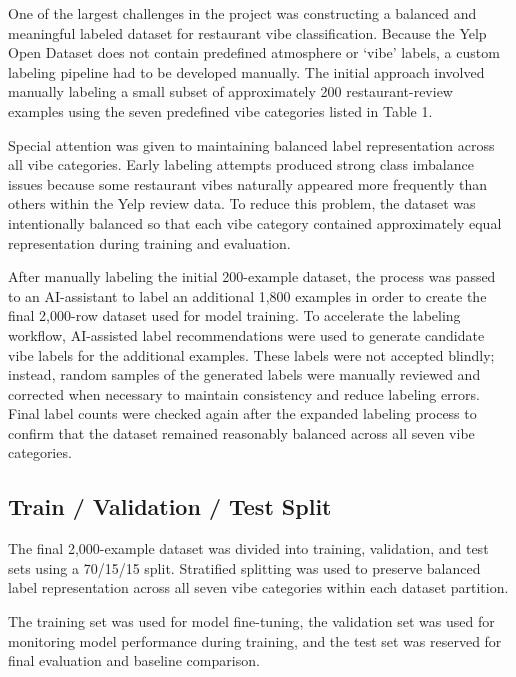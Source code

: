 \documentclass[11pt]{article}
\begin{document}
One of the largest challenges in the project was constructing a balanced and meaningful labeled dataset for restaurant vibe classification. Because the 
Yelp Open Dataset does not contain predefined atmosphere or `vibe' labels, a custom labeling pipeline had to be developed manually. The initial approach 
involved manually labeling a small subset of approximately 200 restaurant-review examples using the seven predefined vibe categories listed in Table 1. 

\medbreak \noindent Special attention was given to maintaining balanced label representation across all vibe categories. Early labeling attempts produced 
strong class imbalance issues because some restaurant vibes naturally appeared more frequently than others within the Yelp review data. To reduce this 
problem, the dataset was intentionally balanced so that each vibe category contained approximately equal representation during training and evaluation.

\medbreak \noindent After manually labeling the initial 200-example dataset, the process was passed to an AI-assistant to label an additional 1,800 examples 
in order to create the final 2,000-row dataset used for model training. To accelerate the labeling workflow, AI-assisted label recommendations were used to 
generate candidate vibe labels for the additional examples. These labels were not accepted blindly; instead, random samples of the generated labels were 
manually reviewed and corrected when necessary to maintain consistency and reduce labeling errors. Final label counts were checked again after the expanded 
labeling process to confirm that the dataset remained reasonably balanced across all seven vibe categories.


\subsection{Train / Validation / Test Split}

The final 2,000-example dataset was divided into training, validation, and test sets using a 70/15/15 split. Stratified splitting was used to preserve 
balanced label representation across all seven vibe categories within each dataset partition.

\medbreak \noindent The training set was used for model fine-tuning, the validation set was used for monitoring model performance during training, and the test set was 
reserved for final evaluation and baseline comparison.
\end{document}
